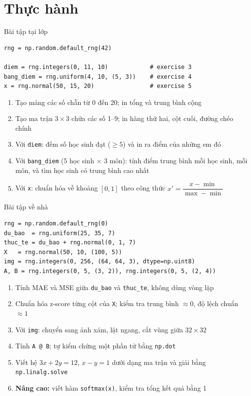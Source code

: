 \documentclass[11pt]{beamer}
\begin{document}
\section{Thực hành}

\begin{frame}[fragile]{Bài tập tại lớp}
\begin{lstlisting}
rng = np.random.default_rng(42)

diem = rng.integers(0, 11, 10)            # exercise 3
bang_diem = rng.uniform(4, 10, (5, 3))    # exercise 4
x = rng.normal(50, 15, 20)                # exercise 5
\end{lstlisting}
\begin{enumerate}
  \item Tạo mảng các số chẵn từ 0 đến 20; in tổng và trung bình cộng
  \item Tạo ma trận $3 \times 3$ chứa các số 1--9; in hàng thứ hai, cột cuối, đường chéo chính
  \item Với \texttt{diem}: đếm số học sinh đạt ($\ge 5$) và in ra điểm của những em đó
  \item Với \texttt{bang\_diem} (5 học sinh $\times$ 3 môn): tính điểm trung bình mỗi học sinh,
        mỗi môn, và tìm học sinh có trung bình cao nhất
  \item Với \texttt{x}: chuẩn hóa về khoảng $[0, 1]$ theo công thức
        $x' = \dfrac{x - \min}{\max - \min}$
\end{enumerate}
\end{frame}

\begin{frame}[fragile]{Bài tập về nhà}
\begin{lstlisting}[basicstyle=\ttfamily\scriptsize]
rng = np.random.default_rng(0)
du_bao  = rng.uniform(25, 35, 7)
thuc_te = du_bao + rng.normal(0, 1, 7)
X   = rng.normal(50, 10, (100, 5))
img = rng.integers(0, 256, (64, 64, 3), dtype=np.uint8)
A, B = rng.integers(0, 5, (3, 2)), rng.integers(0, 5, (2, 4))
\end{lstlisting}
\begin{enumerate}
  \item Tính MAE và MSE giữa \texttt{du\_bao} và \texttt{thuc\_te}, không dùng vòng lặp
  \item Chuẩn hóa z-score từng cột của \texttt{X}; kiểm tra trung bình $\approx 0$, độ lệch chuẩn $\approx 1$
  \item Với \texttt{img}: chuyển sang ảnh xám, lật ngang, cắt vùng giữa $32 \times 32$
  \item Tính \texttt{A @ B}; tự kiểm chứng một phần tử bằng \texttt{np.dot}
  \item Viết hệ $3x + 2y = 12$, $x - y = 1$ dưới dạng ma trận và giải bằng \texttt{np.linalg.solve}
  \item \textbf{Nâng cao:} viết hàm \texttt{softmax(x)}, kiểm tra tổng kết quả bằng 1
\end{enumerate}
\end{frame}
\end{document}
